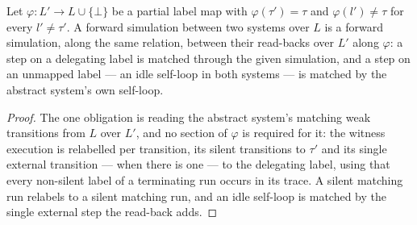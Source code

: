 \begin{theorem}
  \label{thm:mapidle-cong}
  \leanok
  Let $\varphi : L' \to L \cup \{\bot\}$ be a partial label map with $\varphi(\tau') = \tau$ and $\varphi(l') \neq \tau$ for every $l' \neq \tau'$.
  A forward simulation between two systems over $L$ is a forward simulation, along the same relation, between their read-backs over $L'$ along $\varphi$: a step on a delegating label is matched through the given simulation, and a step on an unmapped label --- an idle self-loop in both systems --- is matched by the abstract system's own self-loop.
\end{theorem}

\begin{proof}\leanok
  The one obligation is reading the abstract system's matching weak transitions from $L$ over $L'$, and no section of $\varphi$ is required for it: the witness execution is relabelled per transition, its silent transitions to $\tau'$ and its single external transition --- when there is one --- to the delegating label, using that every non-silent label of a terminating run occurs in its trace.
  A silent matching run relabels to a silent matching run, and an idle self-loop is matched by the single external step the read-back adds.
\end{proof}
